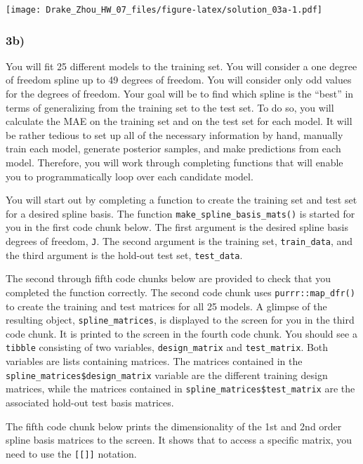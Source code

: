 \documentclass[
]{article}
\begin{document}
\texttt{[image: Drake\_Zhou\_HW\_07\_files/figure-latex/solution\_03a-1.pdf]}

\hypertarget{b-2}{%
\subsubsection{3b)}\label{b-2}}

You will fit 25 different models to the training set. You will consider
a one degree of freedom spline up to 49 degrees of freedom. You will
consider only odd values for the degrees of freedom. Your goal will be
to find which spline is the ``best'' in terms of generalizing from the
training set to the test set. To do so, you will calculate the MAE on
the training set and on the test set for each model. It will be rather
tedious to set up all of the necessary information by hand, manually
train each model, generate posterior samples, and make predictions from
each model. Therefore, you will work through completing functions that
will enable you to programmatically loop over each candidate model.

You will start out by completing a function to create the training set
and test set for a desired spline basis. The function
\texttt{make\_spline\_basis\_mats()} is started for you in the first
code chunk below. The first argument is the desired spline basis degrees
of freedom, \texttt{J}. The second argument is the training set,
\texttt{train\_data}, and the third argument is the hold-out test set,
\texttt{test\_data}.

The second through fifth code chunks below are provided to check that
you completed the function correctly. The second code chunk uses
\texttt{purrr::map\_dfr()} to create the training and test matrices for
all 25 models. A glimpse of the resulting object,
\texttt{spline\_matrices}, is displayed to the screen for you in the
third code chunk. It is printed to the screen in the fourth code chunk.
You should see a \texttt{tibble} consisting of two variables,
\texttt{design\_matrix} and \texttt{test\_matrix}. Both variables are
lists containing matrices. The matrices contained in the
\texttt{spline\_matrices\$design\_matrix} variable are the different
training design matrices, while the matrices contained in
\texttt{spline\_matrices\$test\_matrix} are the associated hold-out test
basis matrices.

The fifth code chunk below prints the dimensionality of the 1st and 2nd
order spline basis matrices to the screen. It shows that to access a
specific matrix, you need to use the \texttt{{[}{[}{]}{]}} notation.
\end{document}
